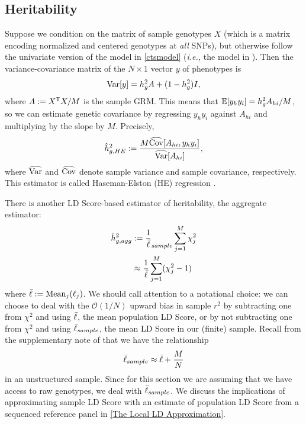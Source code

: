 \documentclass[11pt]{article}
\numberwithin{equation}{section}
\numberwithin{definition}{section}
\numberwithin{thm}{section}
\numberwithin{lemma}{section}
\numberwithin{prop}{section}
\numberwithin{cor}{section}
\numberwithin{hyp}{section}
\begin{document}
\subsection{Heritability}\label{HE:Heritability}

Suppose we condition on the matrix of sample genotypes $X$
(which is a matrix encoding normalized and centered genotypes at \emph{all} SNPs),
but otherwise follow the univariate version of the model in \ref{ctsmodel} (\emph{i.e.,} the model in \cite{buliksullivan2014}).
Then the variance-covariance matrix of the $N\times 1$ vector $y$ of phenotypes is
\begin{equation*}
	\mathrm{Var}[y]  =  h^2_gA + (1-h^2_g)I,
\end{equation*}
where $A := X^{\mathsf{T}}X/M$ is the sample GRM. 
This means that $\mathbb{E}[y_hy_i] = h^2_g A_{hi}/M$,
so we can estimate genetic covariance by regressing $y_hy_i$ against $A_{hi}$
and multiplying by the slope by $M$.
Precisely,
\begin{equation}
	\hat{h}^2_{g,HE} :=  \frac{M\widehat{\mathrm{Cov}}[A_{hi}, y_hy_i]}{\widehat{\mathrm{Var}}[A_{hi}]},
\end{equation}
where $\widehat{\mathrm{Var}}$ and $\widehat{\mathrm{Cov}}$ denote sample variance and sample covariance, respectively.
This estimator is called Haseman-Elston (HE) regression \cite{haseman1972}.

There is another LD Score-based estimator of heritability, 
the aggregate estimator:	
\begin{align}
	\hat{h}^2_{g, agg} 
&:= 
	\frac{1}{\bar{\ell}}_{sample}\sum_{j=1}^M \chi^2_j\\
&\approx
	\frac{1}{\bar{\ell}}\sum_{j=1}^M (\chi^2_j-1)
\end{align}
where $\bar{\ell} := \mathrm{Mean}_j(\ell_j)$. We should call attention to a notational choice: we can choose to deal with the $\mathscr{O}(1/N)$
upward bias in sample $r^2$ by subtracting one from $\chi^2$ and using $\bar{\ell}$, the mean population LD Score,
or by not subtracting one from $\chi^2$ and using $\bar{\ell}_{sample}$, the mean LD Score in our (finite) sample.
Recall from the supplementary note of \cite{buliksullivan2014} that we have the relationship
\begin{equation}
	\bar{\ell}_{sample} \approx \bar{\ell} + \dfrac{M}{N}
\end{equation}
in an unstructured sample.
Since for this section we are assuming that we have access to raw genotypes, we deal with $\bar{\ell}_{sample}$.
We discuss the implications of approximating sample LD Score with an estimate of population LD Score from a sequenced reference panel 
in \ref{The Local LD Approximation}.
\end{document}
